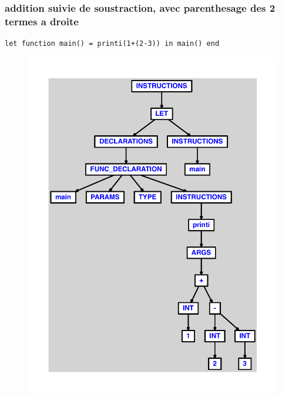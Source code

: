 \documentclass{article}
\begin{document}
\subsubsection{addition suivie de soustraction, avec parenthesage des 2 termes a droite}
\begin{lstlisting}
let function main() = printi(1+(2-3)) in main() end
\end{lstlisting}
\newpage
\begin{figure}[H]
\centering
\includegraphics[max width=\textwidth]{ast/ast_88.pdf}
\end{figure}
\newpage
\end{document}
